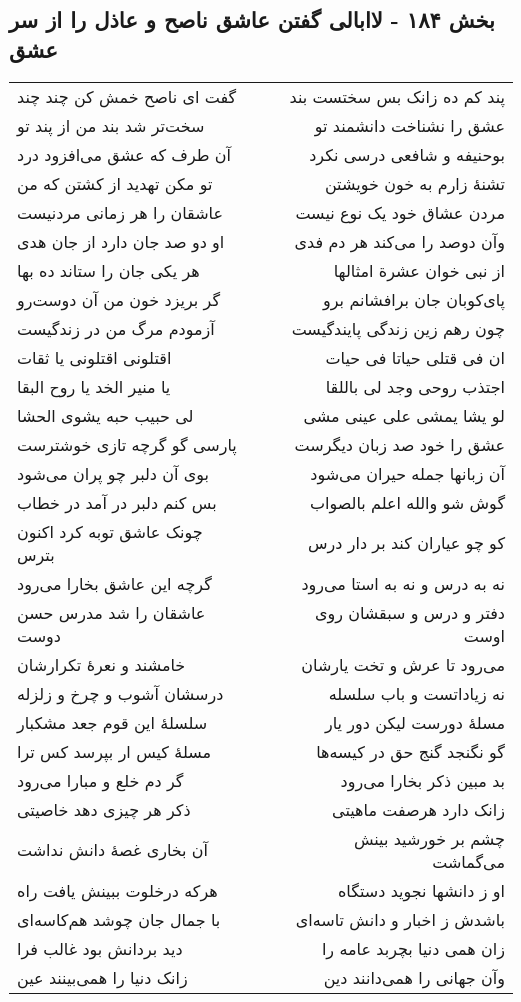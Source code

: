 \begin{center}
\section*{بخش ۱۸۴ - لاابالی گفتن عاشق ناصح و عاذل را از سر عشق}
\label{sec:sh184}
\begin{longtable}{l p{0.5cm} r}
گفت ای ناصح خمش کن چند چند
&&
پند کم ده زانک بس سختست بند
\\
سخت‌تر شد بند من از پند تو
&&
عشق را نشناخت دانشمند تو
\\
آن طرف که عشق می‌افزود درد
&&
بوحنیفه و شافعی درسی نکرد
\\
تو مکن تهدید از کشتن که من
&&
تشنهٔ زارم به خون خویشتن
\\
عاشقان را هر زمانی مردنیست
&&
مردن عشاق خود یک نوع نیست
\\
او دو صد جان دارد از جان هدی
&&
وآن دوصد را می‌کند هر دم فدی
\\
هر یکی جان را ستاند ده بها
&&
از نبی خوان عشرة امثالها
\\
گر بریزد خون من آن دوست‌رو
&&
پای‌کوبان جان برافشانم برو
\\
آزمودم مرگ من در زندگیست
&&
چون رهم زین زندگی پایندگیست
\\
اقتلونی اقتلونی یا ثقات
&&
ان فی قتلی حیاتا فی حیات
\\
یا منیر الخد یا روح البقا
&&
اجتذب روحی وجد لی باللقا
\\
لی حبیب حبه یشوی الحشا
&&
لو یشا یمشی علی عینی مشی
\\
پارسی گو گرچه تازی خوشترست
&&
عشق را خود صد زبان دیگرست
\\
بوی آن دلبر چو پران می‌شود
&&
آن زبانها جمله حیران می‌شود
\\
بس کنم دلبر در آمد در خطاب
&&
گوش شو والله اعلم بالصواب
\\
چونک عاشق توبه کرد اکنون بترس
&&
کو چو عیاران کند بر دار درس
\\
گرچه این عاشق بخارا می‌رود
&&
نه به درس و نه به استا می‌رود
\\
عاشقان را شد مدرس حسن دوست
&&
دفتر و درس و سبقشان روی اوست
\\
خامشند و نعرهٔ تکرارشان
&&
می‌رود تا عرش و تخت یارشان
\\
درسشان آشوب و چرخ و زلزله
&&
نه زیاداتست و باب سلسله
\\
سلسلهٔ این قوم جعد مشکبار
&&
مسلهٔ دورست لیکن دور یار
\\
مسلهٔ کیس ار بپرسد کس ترا
&&
گو نگنجد گنج حق در کیسه‌ها
\\
گر دم خلع و مبارا می‌رود
&&
بد مبین ذکر بخارا می‌رود
\\
ذکر هر چیزی دهد خاصیتی
&&
زانک دارد هرصفت ماهیتی
\\
آن بخاری غصهٔ دانش نداشت
&&
چشم بر خورشید بینش می‌گماشت
\\
هرکه درخلوت ببینش یافت راه
&&
او ز دانشها نجوید دستگاه
\\
با جمال جان چوشد هم‌کاسه‌ای
&&
باشدش ز اخبار و دانش تاسه‌ای
\\
دید بردانش بود غالب فرا
&&
زان همی دنیا بچربد عامه را
\\
زانک دنیا را همی‌بینند عین
&&
وآن جهانی را همی‌دانند دین
\\
\end{longtable}
\end{center}
